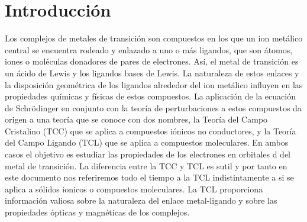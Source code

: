 \documentclass[12pt,a4paper]{article}
\begin{document}
\section{Introducci\'on}
Los complejos de metales de transición son compuestos en los que un ion metálico central se encuentra rodeado
y enlazado a uno o más ligandos, que son átomos, iones o moléculas donadores de pares de electrones. As\'i, el
metal de transici\'on es un \'acido de Lewis y los ligandos bases de Lewis.
La naturaleza de estos enlaces y la disposición geométrica de los ligandos
alrededor del ion metálico influyen en las propiedades químicas y físicas de estos compuestos.
La aplicaci\'on de la ecuación de Schrödinger en conjunto con la teoría de perturbaciones a estos compuestos
da origen a una teor\'ia que se conoce con dos nombres, la Teor\'ia del Campo Cristalino (TCC) que se aplica a
compuestos i\'onicos no conductores, y la Teor\'ia del Campo Ligando (TCL) que se aplica a compuestos moleculares.
En ambos casos el objetivo es estudiar las propiedades de los electrones en orbitales d del metal de transici\'on.
La diferencia entre la TCC y TCL es sutil \cite{Smith2011} y por tanto en este documento nos referiremos todo el
tiempo a la TCL indistintamente a si se aplica a s\'olidos ionicos o compuestos moleculares.
La TCL proporciona información valiosa sobre la naturaleza del enlace metal-ligando y sobre las propiedades \'opticas
y magnéticas de los complejos.
\end{document}

